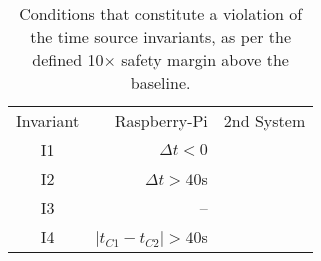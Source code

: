 \begin{table}
    \centering
    \caption{Conditions that constitute a violation of the time source invariants, as per the defined 10$\times$ safety margin above the baseline.}
    \begin{tabular}{crr}
        Invariant & Raspberry-Pi& 2nd System\\
        I1 & $\Delta{}t<0$& \\
        I2& $\Delta{}t>40$\textmu{}s& \\
        I3& --& \\
        I4& $|t_{C1} - t_{C2}| > 40$\textmu{}s& \\
    \end{tabular}
    \label{tbl:invariant-violation-limits}
\end{table}
